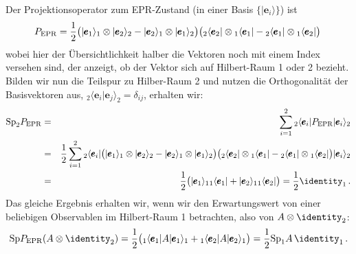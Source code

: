 Der Projektionsoperator zum EPR-Zustand (in einer Basis $\{ |\pmb{e}_i\rangle\}$)
ist
\begin{equation}
    P_{\rm EPR} =  \frac{1}{2} 
        \big( | \pmb{e}_1 \rangle_1 \otimes | \pmb{e}_2 \rangle_2 - 
        | \pmb{e}_2 \rangle_1 \otimes | \pmb{e}_1 \rangle_2 \big) 
         \big( {}_2\langle \pmb{e}_2 | \otimes {}_1\langle \pmb{e}_1 | - 
        {}_2\langle \pmb{e}_1 | \otimes {}_1\langle \pmb{e}_2 | \big) \,
\end{equation}
wobei hier der \"Ubersichtlichkeit halber die Vektoren noch mit einem
Index versehen sind, der anzeigt, ob der Vektor sich auf Hilbert-Raum 1 oder
2 bezieht. Bilden wir nun die Teilspur zu Hilber-Raum 2 und nutzen die
Orthogonalit\"at der Basisvektoren aus, 
$ {}_2 \langle \pmb{e}_i | \pmb{e}_j \rangle_2 = \delta_{ij}$, 
erhalten wir:
\begin{eqnarray}
   {\rm Sp}_2 P_{\rm EPR} 
    &=& \sum_{i=1}^2  {}_2\langle \pmb{e}_i | P_{\rm EPR} | \pmb{e}_i \rangle_2  \\
    &=&  \frac{1}{2}  \sum_{i=1}^2 {}_2\langle \pmb{e}_i |
        \big( | \pmb{e}_1 \rangle_1 \otimes | \pmb{e}_2 \rangle_2 - 
        | \pmb{e}_2 \rangle_1 \otimes | \pmb{e}_1 \rangle_2 \big) 
         \big( {}_2\langle \pmb{e}_2 | \otimes {}_1\langle \pmb{e}_1 | - 
        {}_2\langle \pmb{e}_1 | \otimes {}_1\langle \pmb{e}_2 | \big) |\pmb{e}_i \rangle_2  \\
     &=&   \frac{1}{2}    
     \big( | \pmb{e}_1 \rangle_1 {}_1 \langle \pmb{e}_1 | + | \pmb{e}_2 \rangle_1 {}_1 \langle \pmb{e}_2 | \big)
      = \frac{1}{2} \identity_1 \, .
\end{eqnarray}
Das gleiche Ergebnis erhalten wir, wenn wir den Erwartungswert von einer
beliebigen Observablen im Hilbert-Raum 1 betrachten, also von $A \otimes \identity_2$:
\begin{equation}
    {\rm Sp} P_{\rm EPR} (A \otimes \identity_2) 
    = \frac{1}{2} \big( {}_1 \langle \pmb{e}_1 | A | \pmb{e}_1 \rangle_1 +  
                {}_1 \langle \pmb{e}_2 | A | \pmb{e}_2 \rangle_1 \big)  =  \frac{1}{2} {\rm Sp}_1 A\, \identity_1 \, . 
\end{equation}


